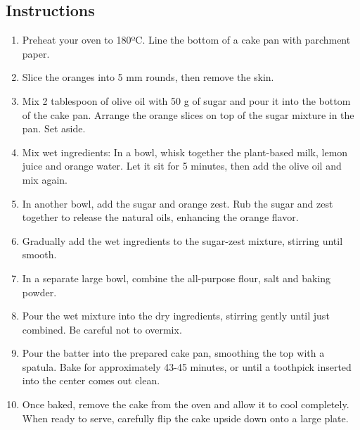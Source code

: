 \subsection*{Instructions}
\begin{enumerate}
 \item Preheat your oven to 180ºC. Line the bottom of a cake pan with parchment paper.
 \item Slice the oranges into 5 mm rounds, then remove the skin.
 \item Mix 2 tablespoon of olive oil with 50 g of sugar and pour it into the bottom of the cake pan. Arrange the orange slices on top of the sugar mixture in the pan. Set aside.
 \item Mix wet ingredients: In a bowl, whisk together the plant-based milk, lemon juice and orange water. Let it sit for 5 minutes, then add the olive oil and mix again.
 \item In another bowl, add the sugar and orange zest. Rub the sugar and zest together to release the natural oils, enhancing the orange flavor.
 \item Gradually add the wet ingredients to the sugar-zest mixture, stirring until smooth.
 \item In a separate large bowl, combine the all-purpose flour, salt and baking powder.
 \item Pour the wet mixture into the dry ingredients, stirring gently until just combined. Be careful not to overmix.
 \item Pour the batter into the prepared cake pan, smoothing the top with a spatula. Bake for approximately 43-45 minutes, or until a toothpick inserted into the center comes out clean.
 \item Once baked, remove the cake from the oven and allow it to cool completely. When ready to serve, carefully flip the cake upside down onto a large plate.
\end{enumerate}
